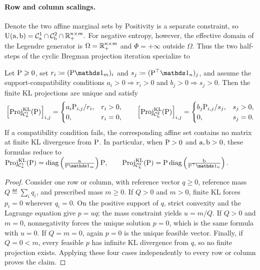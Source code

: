 \paragraph{Row and column scalings.}
Denote the two affine marginal sets by
Positivity is a separate constraint, so
\(\CouplingsD(\a,\b) = \Cc^1_\a\cap\Cc^2_\b\cap\RR_+^{n\times m}.\)
For negative entropy, however, the effective domain of the Legendre generator is $\Omega=\RR_+^{n\times m}$ and $\Phi=+\infty$ outside $\Omega$. Thus the two half-steps of the cyclic Bregman projection iteration specialize to
\begin{prop}
Let $\P\geq0$, set $r_i\eqdef(\P\ones_m)_i$ and $s_j\eqdef(\P^\top\ones_n)_j$, and assume the support-compatibility conditions
\(
a_i>0\Rightarrow r_i>0
\)
and
\(
b_j>0\Rightarrow s_j>0
\).
Then the finite KL projections are unique and satisfy
\[
\left[\Proj_{\Cc^1_\a}^{\KLD}(\P)\right]_{i,j}
=
\begin{cases}
a_i\P_{i,j}/r_i,&r_i>0,\\
0,&r_i=0,
\end{cases}
\qquad
\left[\Proj_{\Cc^2_\b}^{\KLD}(\P)\right]_{i,j}
=
\begin{cases}
b_j\P_{i,j}/s_j,&s_j>0,\\
0,&s_j=0.
\end{cases}
\]
If a compatibility condition fails, the corresponding affine set contains no matrix at finite KL divergence from $\P$. In particular, when $\P>0$ and $\a,\b>0$, these formulas reduce to
\(\Proj_{\Cc^1_\a}^{\KLD}(\P) = \diag\pa{\frac{\a}{\P\ones_m}}\P, \qquad \Proj_{\Cc^2_\b}^{\KLD}(\P) = \P\diag\pa{\frac{\b}{\P^\top\ones_n}}.\)
\end{prop}
\begin{proof}
Consider one row or column, with reference vector $q\geq0$, reference mass $Q\eqdef\sum_iq_i$, and prescribed mass $m\geq0$. If $Q>0$ and $m>0$, finite KL forces $p_i=0$ wherever $q_i=0$. On the positive support of $q$, strict convexity and the Lagrange equation give $p=u q$; the mass constraint yields $u=m/Q$. If $Q>0$ and $m=0$, nonnegativity forces the unique solution $p=0$, which is the same formula with $u=0$. If $Q=m=0$, again $p=0$ is the unique feasible vector. Finally, if $Q=0<m$, every feasible $p$ has infinite KL divergence from $q$, so no finite projection exists. Applying these four cases independently to every row or column proves the claim.
\end{proof}
